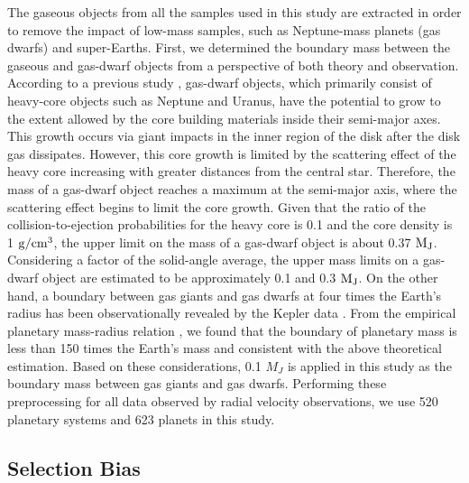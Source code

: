 \documentclass[twocolumn, dvipdfmx]{aastex62}
\begin{document}
\begin{CJK*}{UTF8}{min}
The gaseous objects from all the samples used in this study are extracted in order to remove the impact of low-mass samples, such as Neptune-mass planets (gas dwarfs) and super-Earths. First, we determined the boundary mass between the gaseous and gas-dwarf objects from a perspective of both theory and observation. According to a previous study \citep{2004ApJ...604..388I}, gas-dwarf objects, which primarily consist of heavy-core objects such as Neptune and Uranus, have the potential to grow to the extent allowed by the core building materials inside their semi-major axes. This growth occurs via giant impacts in the inner region of the disk after the disk gas dissipates. However, this core growth is limited by the scattering effect of the heavy core increasing with greater distances from the central star. Therefore, the mass of a gas-dwarf object reaches a maximum at the semi-major axis, where the scattering effect begins to limit the core growth. Given that the ratio of the collision-to-ejection probabilities for the heavy core is 0.1 and the core density is 1 $\rm g/cm^3$, the upper limit on the mass of a gas-dwarf object is about 0.37 $\rm M_J$. Considering a factor of the solid-angle average, the upper mass limits on a gas-dwarf object are estimated to be approximately 0.1 and 0.3 $\rm M_J$. On the other hand, a boundary between gas giants and gas dwarfs at four times the Earth's radius has been observationally revealed by the Kepler data \citep{2012Natur.486..375B}. From the empirical planetary mass-radius relation \cite{2013ApJ...768...14W}, we found that the boundary of planetary mass is less than 150 times the Earth's mass and consistent with the above theoretical estimation. Based on these considerations, 0.1 $M_J$ is applied in this study as the boundary mass between gas giants and gas dwarfs. Performing these preprocessing for all data observed by radial velocity observations, we use 520 planetary systems and 623 planets in this study.


\subsection{Selection Bias} \label{subsec:bias}


\end{CJK*}
\end{document}
